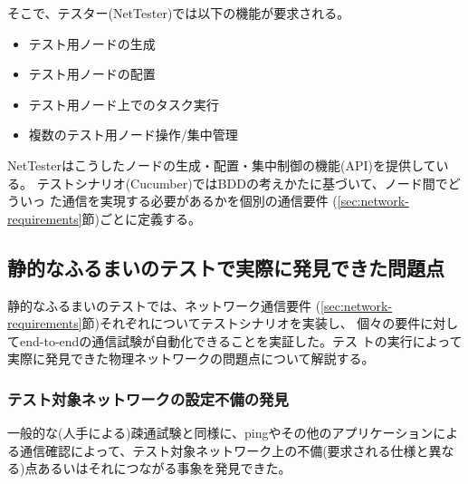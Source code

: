 そこで、テスター(NetTester)では以下の機能が要求される。
\begin{itemize}
 \item テスト用ノードの生成
 \item テスト用ノードの配置
 \item テスト用ノード上でのタスク実行
 \item 複数のテスト用ノード操作/集中管理
\end{itemize}
NetTesterはこうしたノードの生成・配置・集中制御の機能(API)を提供している。
テストシナリオ(Cucumber)ではBDDの考えかたに基づいて、ノード間でどういっ
た通信を実現する必要があるかを個別の通信要件
(\ref{sec:network-requirements}節)ごとに定義する。

  \subsection{静的なふるまいのテストで実際に発見できた問題点}
  \label{sec:statictest-founded-issues}

静的なふるまいのテストでは、\yo ネットワーク通信要件
(\ref{sec:network-requirements}節)それぞれについてテストシナリオを実装し、
個々の要件に対してend-to-endの通信試験が自動化できることを実証した。テス
トの実行によって実際に発見できた物理ネットワークの問題点について解説する。

   \subsubsection{テスト対象ネットワークの設定不備の発見}


一般的な(人手による)疎通試験と同様に、pingやその他のアプリケーションによ
る通信確認によって、テスト対象ネットワーク上の不備(要求される仕様と異な
る)点あるいはそれにつながる事象を発見できた。

